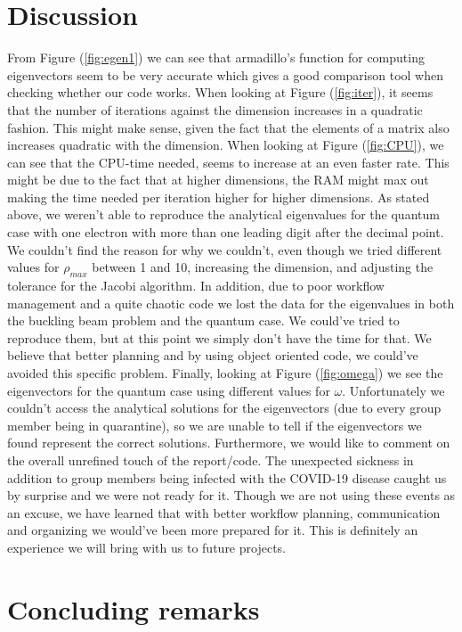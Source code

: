 \documentclass[norsk,a4paper,12pt]{article}
\begin{document}
\section{Discussion}
From Figure (\ref{fig:egen1}) we can see that armadillo's function for computing eigenvectors seem to be very accurate which gives a good comparison tool when checking whether our code works. When looking at Figure (\ref{fig:iter}), it seems that the number of iterations against the dimension increases in a quadratic fashion. This might make sense, given the fact that the elements of a matrix also increases quadratic with the dimension. When looking at Figure (\ref{fig:CPU}), we can see that the CPU-time needed, seems to increase at an even faster rate. This might be due to the fact that at higher dimensions, the RAM might max out making the time needed per iteration higher for higher dimensions. As stated above, we weren't able to reproduce the analytical eigenvalues for the quantum case with one electron with more than one leading digit after the decimal point. We couldn't find the reason for why we couldn't, even though we tried different values for $\rho_{max}$ between 1 and 10, increasing the dimension, and adjusting the tolerance for the Jacobi algorithm. In addition, due to poor workflow management and a quite chaotic code we lost the data for the eigenvalues in both the buckling beam problem and the quantum case. We could've tried to reproduce them, but at this point we simply don't have the time for that. We believe that better planning and by using object oriented code, we could've avoided this specific problem. Finally, looking at Figure (\ref{fig:omega}) we see the eigenvectors for the quantum case using different values for $\omega$. Unfortunately we couldn't access the analytical solutions for the eigenvectors (due to every group member being in quarantine), so we are unable to tell if the eigenvectors we found represent the correct solutions. Furthermore, we would like to comment on the overall unrefined touch of the report/code. The unexpected sickness in addition to group members being infected with the COVID-19 disease caught us by surprise and we were not ready for it. Though we are not using these events as an excuse, we have learned that with better workflow planning, communication and organizing we would've been more prepared for it. This is definitely an experience we will bring with us to future projects.  

\section{Concluding remarks}
\end{document}
